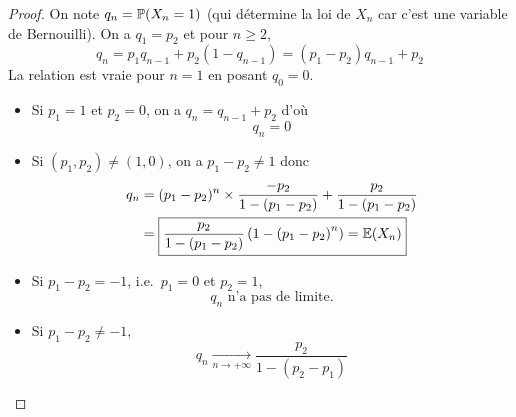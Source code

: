 \documentclass[12pt]{article}
\begin{document}
\begin{proof}

    On note $q_{n}=\P(X_{n}=1)$ (qui détermine la loi de $X_{n}$ car c'est une variable de Bernouilli). On a $q_{1}=p_{2}$ et pour $n\geqslant2$,
    \begin{equation}
        q_{n}=p_{1}q_{n-1}+p_{2}(1-q_{n-1})=(p_{1}-p_{2})q_{n-1}+p_{2}
    \end{equation}
    La relation est vraie pour $n=1$ en posant $q_{0}=0$.

    \begin{itemize}
        \item Si $p_{1}=1$ et $p_{2}=0$, on a $q_{n}=q_{n-1}+p_{2}$ d'où 
        \begin{equation}
            \boxed{q_{n}=0}
        \end{equation}

        \item Si $(p_{1},p_{2})\neq(1,0)$, on a $p_{1}-p_{2}\neq1$ donc 
        \begin{align}
            q_{n}
            &=(p_{1}-p_{2})^{n}\times \frac{-p_{2}}{1-(p_{1}-p_{2})}+\frac{p_{2}}{1-(p_{1}-p_{2})}\\
            &=\boxed{\frac{p_{2}}{1-(p_{1}-p_{2})}\left(1-\left(p_{1}-p_{2}\right)^{n}\right)=\E(X_{n})}
        \end{align}

        \item Si $p_{1}-p_{2}=-1$, i.e.~$p_{1}=0$ et $p_{2}=1$, 
        \begin{equation}
            \boxed{q_{n}\text{ n'a pas de limite.}}
        \end{equation}

        \item Si $p_{1}-p_{2}\neq-1$,
        \begin{equation}
            \boxed{q_{n}\xrightarrow[n\to+\infty]{}\frac{p_{2}}{1-(p_{2}-p_{1})}}
        \end{equation}
    \end{itemize}
\end{proof}
\end{document}
